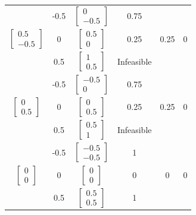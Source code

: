 \begin{latin}
\begin{longtable}{|c|c|c|c|c|c|}
		& -0.5 &$\begin{bmatrix} 0 \\ -0.5 \end{bmatrix}$      &      0.75     &        &         \\ \cline{2-4}
		\multirow{-3}{*}{$\begin{bmatrix} 0.5 \\ -0.5 \end{bmatrix}$}& 0   &$\begin{bmatrix} 0.5 \\ 0 \end{bmatrix}$      &       0.25                 &      0.25       &  0  \\ \cline{2-4}
		& 0.5  &$\begin{bmatrix} 1 \\ 0.5 \end{bmatrix}$      & Infeasible                        &   &                \\	\cline{2-4} \hline
		
		&            -0.5            &$\begin{bmatrix} -0.5 \\ 0 \end{bmatrix}$      &     0.75             &         &         \\  \cline{2-4} 
		\multirow{-3}{*}{$\begin{bmatrix} 0 \\ 0.5 \end{bmatrix}$}&        0                &$\begin{bmatrix} 0 \\ 0.5 \end{bmatrix}$      &      0.25                  &  0.25            &  0  \\  \cline{2-4} 
		&           0.5             &$\begin{bmatrix} 0.5 \\ 1 \end{bmatrix}$      & Infeasible                        &          &  \\  \cline{2-4} \hline
		
		&          -0.5              &$\begin{bmatrix} -0.5 \\ -0.5 \end{bmatrix}$      &        1             &      &        \\  \cline{2-4} 
		\multirow{-3}{*}{$\begin{bmatrix} 0 \\ 0 \end{bmatrix}$}&       0                 &$\begin{bmatrix} 0 \\ 0 \end{bmatrix}$      &     0                   &        0        &0  \\  \cline{2-4} 
		&           0.5             &$\begin{bmatrix} 0.5 \\ 0.5 \end{bmatrix}$      &             1            &           &  \\  \cline{2-4} \hline
		

\end{longtable}
\end{latin}
